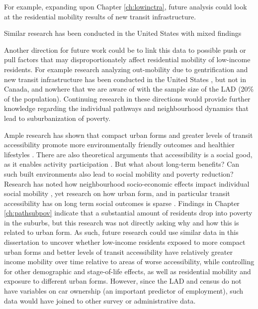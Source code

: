 For example, expanding upon Chapter \ref{ch:lowinctra}, future analysis could look at the residential mobility results of new transit infrastructure. 

Similar research has been conducted in the United States with mixed findings \cite{delmelle_new_2020, delmelle_transit-induced_2021}

 Another direction for future work could be to link this data to possible push or pull factors that may disproportionately affect residential mobility of low-income residents. For example research analyzing out-mobility due to gentrification and new transit infrastructure has been conducted in the United States \cite{freeman_displacement_2005,delmelle_new_2020}, but not in Canada, and nowhere that we are aware of with the sample size of the LAD (20\% of the population). Continuing research in these directions would provide further knowledge regarding the individual pathways and neighbourhood dynamics that lead to suburbanization of poverty.

% 







Ample research has shown that compact urban forms and greater levels of transit accessibility promote more environmentally friendly outcomes and healthier lifestyles \cite{ewing_compactness_2015,ewing_travel_2010,cervero_travel_1997}. There are also theoretical arguments that accessibility is a social good, as it enables activity participation \cite{martens_transport_2016,pereira_distributive_2017}. But what about long-term benefits? Can such built environments also lead to social mobility and poverty reduction? Research has noted how neighbourhood socio-economic effects impact individual social mobility \cite{chetty_effects_2016}, yet research on how urban form, and in particular transit accessibility has on long term social outcomes is sparse \cite{ewing_does_2016,fransen_relationship_2019}. Findings in Chapter \ref{ch:pathsubpov} indicate that a substantial amount of residents drop into poverty in the suburbs, but this research was not directly asking why and how this is related to urban form. As such, future research could use similar data in this dissertation to uncover whether low-income residents exposed to more compact urban forms and better levels of transit accessibility have relatively greater income mobility over time relative to areas of worse accessibility, while controlling for other demographic and stage-of-life effects, as well as residential mobility and exposure to different urban forms. However, since the LAD and census do not have variables on car ownership (an important predictor of employment), such data would have joined to other survey or administrative data.

